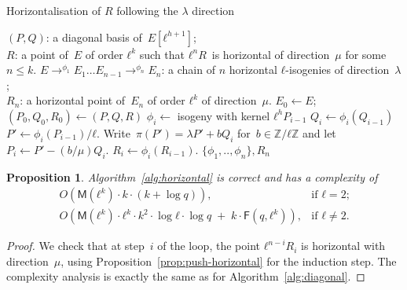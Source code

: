 \documentclass{lms}
\newtheorem{prop}[thm]{Proposition}
\def\pa#1{\left(#1\right)}
\def\cout#1{\mathsf{#1}}
\begin{document}
\begin{algorithm}
\caption{\label{alg:horizontal}Horizontalisation of $R$ following the $\lambda$ direction}
\begin{algorithmic}[1]
\REQUIRE $(P, Q)$: a diagonal basis of~$E[ℓ^{h+1}]$;\\
$R$: a point of~$E$ of order $ℓ^k$ such that
$ℓ^n R$~is horizontal of direction~$μ$ for some~$n ≤ k$.
\ENSURE $E →^{ϕ_1} E_{1} … E_{n-1} →^{ϕ_n} E_n$:
a chain of $n$ horizontal $ℓ$-isogenies of direction~$λ$;\\
$R_n$: a horizontal point of~$E_{n}$ of order $ℓ^k$ of direction~$μ$.
\STATE $E_0 \gets E$; $(P_0, Q_0, R_0) \gets (P, Q, R)$
\STATE $ϕ_i\gets $ isogeny with kernel ${ℓ^h P_{i-1}}$
\STATE $Q_{i} \gets ϕ_i(Q_{i-1})$
\STATE $P' \gets ϕ_i(P_{i-1})/ℓ$.
\STATE Write~$π(P') = λ P' + b Q_i$ for~$b ∈ ℤ/ℓℤ$ and
let $P_{i} \gets P' - (b/μ) Q_i$.
\STATE $R_i \gets ϕ_i(R_{i-1})$.
\ENDFOR
\RETURN $\{ϕ_1,..,ϕ_n\}, R_n $
\end{algorithmic}
\end{algorithm}
\begin{prop}
Algorithm~\ref{alg:horizontal} is correct and has a complexity of
\begin{equation*}
\begin{array}{ll}
O\pa{\cout{M}(ℓ^k) · k · (k + \log q)}, &\text{if $ℓ = 2$;}\\
O\pa{\cout{M}(ℓ^k) · ℓ^k · k^2 · \log ℓ · \log q
  \;+\; k · \cout{F}(q, ℓ^k)}, &\text{if $ℓ ≠ 2$.}
\end{array}
\end{equation*}
\end{prop}
%  
\begin{proof}
We check that at step~$i$ of the loop,
the point $ℓ^{n-i} R_i$ is horizontal with direction~$μ$,
using Proposition~\ref{prop:push-horizontal} for the induction step.
The complexity analysis %
is exactly the same as for Algorithm~\ref{alg:diagonal}.
\end{proof}
\end{document}

